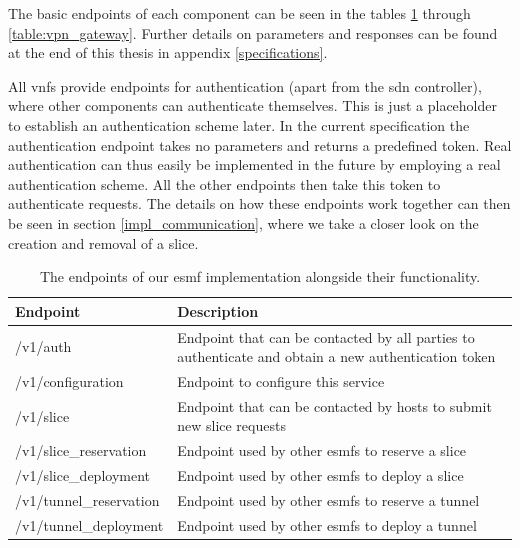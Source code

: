 The basic endpoints of each component can be seen in the tables \ref{table:esmf} through \ref{table:vpn_gateway}. Further details on parameters and responses can be found at the end of this thesis in appendix \ref{specifications}.

All \acrshort{vnf}s provide endpoints for authentication (apart from the \acrshort{sdn} controller), where other components can authenticate themselves. This is just a placeholder to establish an authentication scheme later. In the current specification the authentication endpoint takes no parameters and returns a predefined token. Real authentication can thus easily be implemented in the future by employing a real authentication scheme. All the other endpoints then take this token to authenticate requests. The details on how these endpoints work together can then be seen in section \ref{impl_communication}, where we take a closer look on the creation and removal of a slice.

\begin{table}[htp]
    \begin{tabularx}{\textwidth}{ |l|X| }
        \hline
        \textbf{Endpoint}       & \textbf{Description}                                                                                \\
        \hline
        /v1/auth                & Endpoint that can be contacted by all parties to authenticate and obtain a new authentication token \\
        /v1/configuration       & Endpoint to configure this service                                                                  \\
        \hline
        /v1/slice               & Endpoint that can be contacted by hosts to submit new slice requests                                \\
        \hline
        /v1/slice\_reservation  & Endpoint used by other \acrshort{esmf}s to reserve a slice                                          \\
        /v1/slice\_deployment   & Endpoint used by other \acrshort{esmf}s to deploy a slice                                           \\
        /v1/tunnel\_reservation & Endpoint used by other \acrshort{esmf}s to reserve a tunnel                                         \\
        /v1/tunnel\_deployment  & Endpoint used by other \acrshort{esmf}s to deploy a tunnel                                          \\
        \hline
    \end{tabularx}
    \caption[\acrshort{esmf} endpoints]{The endpoints of our \acrshort{esmf} implementation alongside their functionality.}
    \label{table:esmf}
\end{table}


